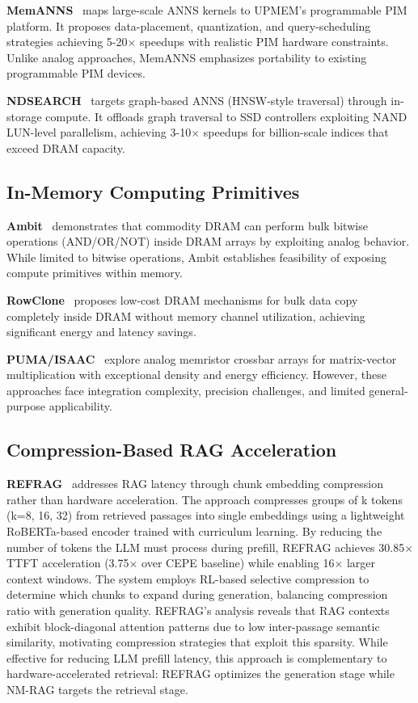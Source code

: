 \documentclass[conference]{IEEEtran}
\begin{document}
\textbf{MemANNS}~\cite{memanns} maps large-scale ANNS kernels to UPMEM's programmable PIM platform. It proposes data-placement, quantization, and query-scheduling strategies achieving 5-20$\times$ speedups with realistic PIM hardware constraints. Unlike analog approaches, MemANNS emphasizes portability to existing programmable PIM devices.

\textbf{NDSEARCH}~\cite{ndsearch} targets graph-based ANNS (HNSW-style traversal) through in-storage compute. It offloads graph traversal to SSD controllers exploiting NAND LUN-level parallelism, achieving 3-10$\times$ speedups for billion-scale indices that exceed DRAM capacity.

\subsection{In-Memory Computing Primitives}

\textbf{Ambit}~\cite{seshadri2017ambit} demonstrates that commodity DRAM can perform bulk bitwise operations (AND/OR/NOT) inside DRAM arrays by exploiting analog behavior. While limited to bitwise operations, Ambit establishes feasibility of exposing compute primitives within memory.

\textbf{RowClone}~\cite{seshadri2013rowclone} proposes low-cost DRAM mechanisms for bulk data copy completely inside DRAM without memory channel utilization, achieving significant energy and latency savings.

\textbf{PUMA/ISAAC}~\cite{chi2016puma, shafiee2016isaac} explore analog memristor crossbar arrays for matrix-vector multiplication with exceptional density and energy efficiency. However, these approaches face integration complexity, precision challenges, and limited general-purpose applicability.

\subsection{Compression-Based RAG Acceleration}

\textbf{REFRAG}~\cite{refrag2025} addresses RAG latency through chunk embedding compression rather than hardware acceleration. The approach compresses groups of k tokens (k=8, 16, 32) from retrieved passages into single embeddings using a lightweight RoBERTa-based encoder trained with curriculum learning. By reducing the number of tokens the LLM must process during prefill, REFRAG achieves 30.85$\times$ TTFT acceleration (3.75$\times$ over CEPE baseline) while enabling 16$\times$ larger context windows. The system employs RL-based selective compression to determine which chunks to expand during generation, balancing compression ratio with generation quality. REFRAG's analysis reveals that RAG contexts exhibit block-diagonal attention patterns due to low inter-passage semantic similarity, motivating compression strategies that exploit this sparsity. While effective for reducing LLM prefill latency, this approach is complementary to hardware-accelerated retrieval: REFRAG optimizes the generation stage while NM-RAG targets the retrieval stage.
\end{document}
